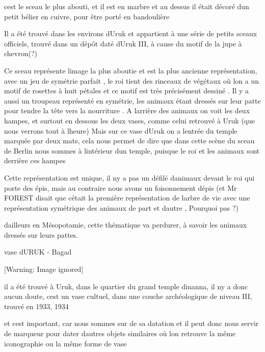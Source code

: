 \documentclass{article}
\begin{document}
c{\textquotesingle}est le sceau le plus abouti, et il est en marbre et
au dessus il était décoré d{\textquotesingle}un petit bélier en cuivre,
pour être porté en bandoulière

Il a été trouvé dans les environs d{\textquotesingle}Uruk et appartient
à une série de petits sceaux officiels, trouvé dans un dépôt daté
d{\textquotesingle}Uruk III, à cause du motif de la jupe à chevron(?)

Ce sceau représente l{\textquotesingle}image la plus aboutie et est la
plus ancienne représentation, avec un jeu de symétrie parfait , le roi
tient des rinceaux de végétaux où l{\textquotesingle}on a un motif de
rosettes à huit pétales et ce motif est très précisément dessiné . Il y
a aussi un troupeau représenté en symétrie, les animaux étant dressés
sur leur patte pour tendre la tête vers la nourriture . A
l{\textquotesingle}arrière des animaux on voit les deux hampes, et
surtout en dessous les deux vases, comme celui retrouvé à Uruk (que
nous verrons tout à l{\textquotesingle}heure) Mais sur ce vase
d{\textquotesingle}Uruk on a l{\textquotesingle}entrée du temple
marquée par deux mats, cela nous permet de dire que dans cette scène du
sceau de Berlin nous sommes à l{\textquotesingle}intérieur
d{\textquotesingle}un temple, puisque le roi et les animaux sont
derrière ces hampes

Cette représentation est unique, il n{\textquotesingle}y a pas un défilé
d{\textquotesingle}animaux devant le roi qui porte des épis,  mais au
contraire nous avons un foisonnement d{\textquotesingle}épis (et Mr
FOREST disait que c{\textquotesingle}était la première représentation
de l{\textquotesingle}arbre de vie avec une représentation symétrique
des animaux de part et d{\textquotesingle}autre , Pourquoi pas ?)

d{\textquotesingle}ailleurs en Mésopotamie, cette thématique va
perdurer,  à savoir les animaux dressés sur leurs pattes.

vase d{\textquotesingle}URUK - Bagad\ \ 

  [Warning: Image ignored] %
 

il a été trouvé à Uruk, dans le quartier du grand temple
d{\textquotesingle}inanna, il n{\textquotesingle}y a donc aucun doute,
c{\textquotesingle}est un vase cultuel, dans une couche archéologique
de niveau III, trouvé en 1933, 1934

et c{\textquotesingle}est important, car nous sommes sur de sa datation
et il peut donc nous servir de marqueur pour dater
d{\textquotesingle}autres objets similaires où l{\textquotesingle}on
retrouve la même iconographie ou la même forme de vase
\end{document}
